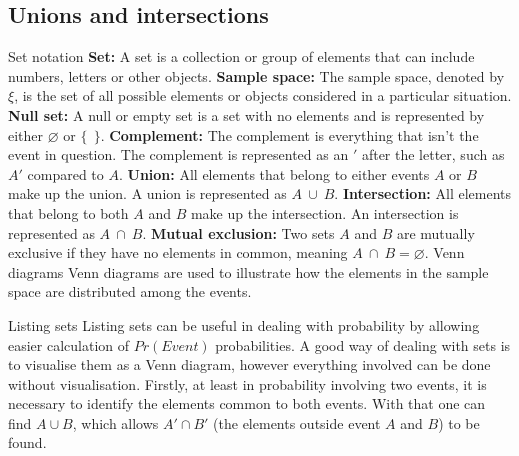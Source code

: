 \begin{outline}
\subsection{Unions and intersections}
	\1 Set notation
		\2 \textbf{Set: } A set is a collection or group of elements that can include numbers, letters or other objects.
		\2 \textbf{Sample space: } The sample space, denoted by $\xi$, is the set of all possible elements or objects considered in a particular situation.
		\2 \textbf{Null set: } A null or empty set is a set with no elements and is represented by either $\varnothing$ or $\{\ \ \}$.
		\2 \textbf{Complement: } The complement is everything that isn't the event in question. The complement is represented as an $'$ after the letter, such as $A'$ compared to $A$.
		\2 \textbf{Union: } All elements that belong to either events $A$ or $B$ make up the union. A union is represented as $A\ \cup\ B$.
		\2 \textbf{Intersection: } All elements that belong to both $A$ and $B$ make up the intersection. An intersection is represented as $A\ \cap\ B$.
		\2 \textbf{Mutual exclusion: } Two sets $A$ and $B$ are mutually exclusive if they have no elements in common, meaning $A\ \cap\ B = \varnothing$.
	\1 Venn diagrams
		\2 Venn diagrams are used to illustrate how the elements in the sample space are distributed among the events.
\begin{center}
\end{center}
	\1 Listing sets
		\2 Listing sets can be useful in dealing with probability by allowing easier calculation of $Pr(Event)$ probabilities. A good way of dealing with sets is to visualise them as a Venn diagram, however everything involved can be done without visualisation. Firstly, at least in probability involving two events, it is necessary to identify the elements common to both events. With that one can find $A \cup B$, which allows $A' \cap B'$ (the elements outside event $A$ and $B$) to be found.

\end{outline}
